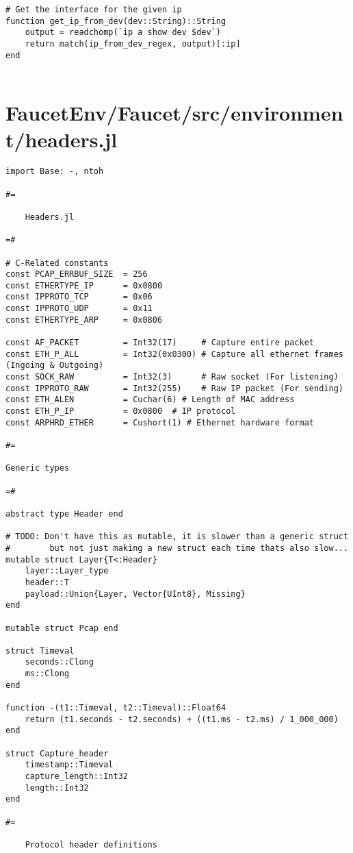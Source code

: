 \begin{lstlisting}[language=JuliaLocal, style=julia]
# Get the interface for the given ip
function get_ip_from_dev(dev::String)::String
    output = readchomp(`ip a show dev $dev`)
    return match(ip_from_dev_regex, output)[:ip]
end
        
\end{lstlisting}
\section{FaucetEnv/Faucet/src/environment/headers.jl}
\begin{lstlisting}[language=JuliaLocal, style=julia]
import Base: -, ntoh

#=

    Headers.jl

=#

# C-Related constants
const PCAP_ERRBUF_SIZE  = 256
const ETHERTYPE_IP      = 0x0800
const IPPROTO_TCP       = 0x06
const IPPROTO_UDP       = 0x11
const ETHERTYPE_ARP     = 0x0806

const AF_PACKET         = Int32(17)     # Capture entire packet
const ETH_P_ALL         = Int32(0x0300) # Capture all ethernet frames (Ingoing & Outgoing)
const SOCK_RAW          = Int32(3)      # Raw socket (For listening)
const IPPROTO_RAW       = Int32(255)    # Raw IP packet (For sending)
const ETH_ALEN          = Cuchar(6) # Length of MAC address
const ETH_P_IP          = 0x0800  # IP protocol
const ARPHRD_ETHER      = Cushort(1) # Ethernet hardware format

#=

Generic types

=#

abstract type Header end

# TODO: Don't have this as mutable, it is slower than a generic struct
#        but not just making a new struct each time thats also slow...
mutable struct Layer{T<:Header}
    layer::Layer_type
    header::T
    payload::Union{Layer, Vector{UInt8}, Missing}
end

mutable struct Pcap end

struct Timeval
    seconds::Clong
    ms::Clong
end

function -(t1::Timeval, t2::Timeval)::Float64
    return (t1.seconds - t2.seconds) + ((t1.ms - t2.ms) / 1_000_000)
end

struct Capture_header
    timestamp::Timeval
    capture_length::Int32
    length::Int32
end

#=

    Protocol header definitions


\end{lstlisting}
